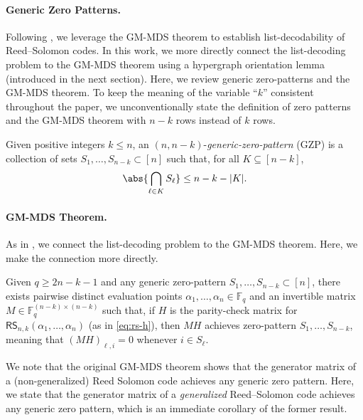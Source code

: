 \documentclass{article}[11pt]
\def\RS{\mathsf{RS}}
\begin{document}
\paragraph{Generic Zero Patterns.}
Following \cite{BGM23}, we leverage the GM-MDS theorem to establish list-decodability of Reed--Solomon codes.
In this work, we more directly connect the list-decoding problem to the GM-MDS theorem using a hypergraph orientation lemma (introduced in the next section).
Here, we review generic zero-patterns and the GM-MDS theorem.
To keep the meaning of the variable ``$k$'' consistent throughout the paper, we unconventionally state the definition of zero patterns and the GM-MDS theorem with $n-k$ rows instead of $k$ rows.
\begin{definition}
  Given positive integers $k \le n$, an $(n,n-k)$-\emph{generic-zero-pattern} (GZP) is a collection of sets $S_1, \ldots , S_{n-k} \subset [n]$ such that, for all $K \subseteq [n-k]$,
  \begin{align}
    \abs{\bigcap_{\ell\in K} S_\ell} \le n - k - |K|.
    \label{eq:gzp}
  \end{align}
\end{definition}






\paragraph{GM-MDS Theorem.}
As in \cite{BGM23}, we connect the list-decoding problem to the GM-MDS theorem. Here, we make the connection more directly.
\begin{theorem}
  Given $q\ge 2n-k-1$ and any generic zero-pattern $S_1,\dots,S_{n-k} \subset [n]$, there exists pairwise distinct evaluation points $\alpha_1,\dots,\alpha_n \in \mathbb{F}_q$ and an invertible matrix $M\in \mathbb{F}_q^{(n-k)\times (n-k)}$ such that, if $H$ is the parity-check matrix for $\RS_{n,k}(\alpha_1,\dots,\alpha_n)$ (as in \eqref{eq:rs-h}), then $MH$ achieves zero-pattern $S_1,\dots,S_{n-k}$, meaning that $(MH)_{\ell,i}=0$ whenever $i\in S_\ell$.
  \label{thm:gm-mds}
\end{theorem}
We note that the original GM-MDS theorem shows that the generator matrix of a (non-generalized) Reed Solomon code achieves any generic zero pattern. Here, we state that the generator matrix of a \emph{generalized} Reed--Solomon code achieves any generic zero pattern, which is an immediate corollary of the former result.
\end{document}
